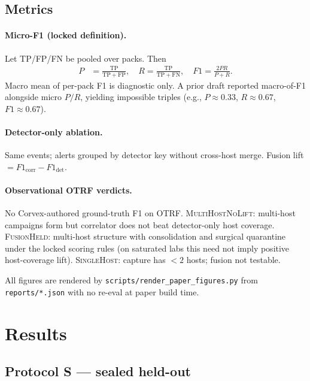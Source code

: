 \documentclass[conference,compsoc]{IEEEtran}
\newcounter{definition}
\begin{document}
\subsection{Metrics}
\paragraph{Micro-F1 (locked definition).}
Let TP/FP/FN be pooled over packs. Then
\begin{align}
P&=\frac{\mathrm{TP}}{\mathrm{TP}+\mathrm{FP}},\quad
R=\frac{\mathrm{TP}}{\mathrm{TP}+\mathrm{FN}},\quad
F1=\frac{2PR}{P+R}.
\end{align}
Macro mean of per-pack F1 is diagnostic only.
A prior draft reported macro-of-F1 alongside micro $P/R$, yielding impossible
triples (e.g., $P\!\approx\!0.33$, $R\!\approx\!0.67$, $F1\!\approx\!0.67$).

\paragraph{Detector-only ablation.}
Same events; alerts grouped by detector key without cross-host merge.
Fusion lift $=F1_{\mathrm{corr}}-F1_{\mathrm{det}}$.

\paragraph{Observational OTRF verdicts.}
No Corvex-authored ground-truth F1 on OTRF.
\textsc{MultiHostNoLift}: multi-host campaigns form but correlator does not beat
detector-only host coverage.
\textsc{FusionHeld}: multi-host structure with consolidation and surgical
quarantine under the locked scoring rules (on saturated labs this need not
imply positive host-coverage lift).
\textsc{SingleHost}: capture has $<2$ hosts; fusion not testable.

All figures are rendered by \texttt{scripts/render\_paper\_figures.py} from
\texttt{reports/*.json} with no re-eval at paper build time.

\section{Results}
\label{sec:results}

\subsection{Protocol S --- sealed held-out}
\label{sec:sealed}
\end{document}
